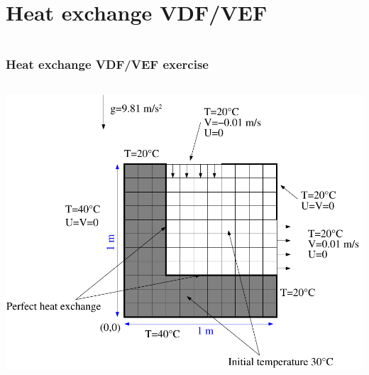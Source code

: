 \documentclass[10pt]{beamer}
\begin{document}
\section{Heat exchange VDF/VEF}
\begin{frame}
\begin{columns}[c] 
\tableofcontents[sections={1-7},currentsection, currentsubsection]
\tableofcontents[sections={8-13},currentsection, currentsubsection]
\end{columns}
\end{frame}
\begin{frame}
\frametitle{Heat exchange VDF/VEF exercise}
\begin{block}{}


\begin{columns}[c] 
\begin{center}
\includegraphics[width=1.\textwidth]{PICTURES/heat_exchange.pdf}
\end{center}


\end{columns}
\end{block}
\end{frame}
\end{document}
